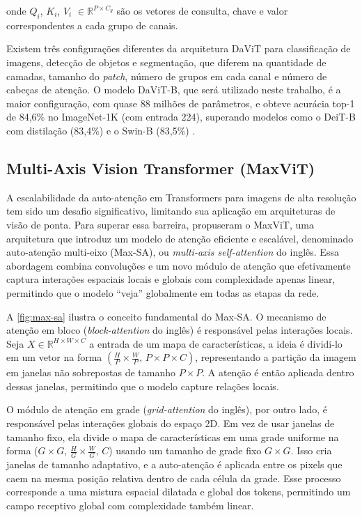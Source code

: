 onde $Q_i$, $K_i$, $V_i$ $\in \mathbb{R}^{P \times C_g}$ são os vetores de consulta, chave e valor correspondentes a cada grupo de canais.

Existem três configurações diferentes da arquitetura DaViT para classificação de imagens, detecção de objetos e segmentação, que diferem na quantidade de camadas, tamanho do \textit{patch}, número de grupos em cada canal e número de cabeças de atenção. O modelo DaViT-B, que será utilizado neste trabalho, é a maior configuração, com quase 88 milhões de parâmetros, e obteve acurácia top-1 de 84,6\% no ImageNet-1K (com entrada 224), superando modelos como o DeiT-B com distilação (83,4\%) e o Swin-B (83,5\%) \citep{Touvron2021, Liu2021}.

\subsection{Multi-Axis Vision Transformer (MaxViT)}

A escalabilidade da auto-atenção em Transformers para imagens de alta resolução tem sido um desafio significativo, limitando sua aplicação em arquiteturas de visão de ponta. Para superar essa barreira, \cite{maxvit2022} propuseram o MaxViT, uma arquitetura que introduz um modelo de atenção eficiente e escalável, denominado auto-atenção multi-eixo (Max-SA), ou \textit{multi-axis self-attention} do inglês. Essa abordagem combina convoluções e um novo módulo de atenção que efetivamente captura interações espaciais locais e globais com complexidade apenas linear, permitindo que o modelo ``veja'' globalmente em todas as etapas da rede.

A \autoref{fig:max-sa} ilustra o conceito fundamental do Max-SA. O mecanismo de atenção em bloco (\textit{block-attention} do inglês) é responsável pelas interações locais. Seja $X \in \mathbb{R}^{H \times W \times C}$ a entrada de um mapa de características, a ideia é dividi-lo em um vetor na forma $(\frac{H}{P} \times \frac{W}{P} \text{, } P \times P \times C)$, representando a partição da imagem em janelas não sobrepostas de tamanho $P \times P$. A atenção é então aplicada dentro dessas janelas, permitindo que o modelo capture relações locais.

O módulo de atenção em grade (\textit{grid-attention} do inglês), por outro lado, é responsável pelas interações globais do espaço 2D. Em vez de usar janelas de tamanho fixo, ela divide o mapa de características em uma grade uniforme na forma ($G \times G \text{, } \frac{H}{G} \times \frac{W}{G} \text{, } C$) usando um tamanho de grade fixo $G \times G$. Isso cria janelas de tamanho adaptativo, e a auto-atenção é aplicada entre os pixels que caem na mesma posição relativa dentro de cada célula da grade. Esse processo corresponde a uma mistura espacial dilatada e global dos tokens, permitindo um campo receptivo global com complexidade também linear.

